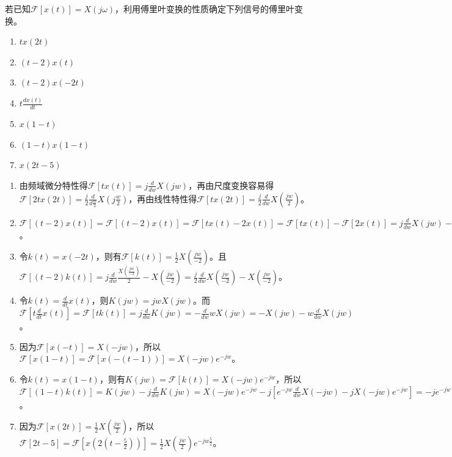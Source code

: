 \documentclass[answers]{exam}  %
\begin{document}
\begin{questions}
\question 若已知$\mathcal{F}[x(t)] = X(j\omega)$，利用傅里叶变换的性质确定下列信号的傅里叶变换。
\begin{enumerate}[(1)]
	\item $tx(2t)$
	\item $(t-2)x(t)$
	\item $(t-2)x(-2t)$
	\item $t\frac{dx(t)}{dt}$
	\item $x(1-t)$
	\item $(1-t)x(1-t)$
	\item $x(2t-5)$
\end{enumerate}


\begin{solution}
	\begin{enumerate}[(1)]
		\item 由频域微分特性得$\mathcal{F}[tx(t)]=j\frac{d}{dw}X(jw)$，再由尺度变换容易得$\mathcal{F}[2tx(2t)]=\frac{j}{2}\frac{d}{d\frac{w}{2}}X(j\frac{w}{2})$，再由线性特性得$\mathcal{F}[tx(2t)]=\frac{j}{2}\frac{d}{dw}X(\frac{jw}{2})$。
		\item $\mathcal{F}[(t-2)x(t)]=\mathcal{F}[(t-2)x(t)]=\mathcal{F}[tx(t)-2x(t)]=\mathcal{F}[tx(t)]-\mathcal{F}[2x(t)]=j\frac{d}{dw}X(jw)-2X(jw)$。
		\item 令$k(t)=x(-2t)$，则有$\mathcal{F}[k(t)]=\frac{1}{2}X(\frac{jw}{-2})$。且$\mathcal{F}[(t-2)k(t)]=j\frac{d}{dw}\frac{X(\frac{jw}{-2})}{2}-X(\frac{jw}{-2})=\frac{j}{2}\frac{d}{dw}X(\frac{jw}{-2})-X(\frac{jw}{-2})$。
		\item 令$k(t)=\frac{d}{dt}x(t)$，则$K(jw)=jwX(jw)$。而$\mathcal{F}[t\frac{d}{dt}x(t)]=\mathcal{F}[tk(t)]=j\frac{d}{dw}K(jw)=-\frac{d}{dw}wX(jw)=-X(jw)-w\frac{d}{dw}X(jw)$。
		\item 因为$\mathcal{F}[x(-t)]=X(-jw)$，所以$\mathcal{F}[x(1-t)]=\mathcal{F}[x(-(t-1))]=X(-jw)e^{-jw}$。
		\item 令$k(t)=x(1-t)$，则有$K(jw)=\mathcal{F}[k(t)]=X(-jw)e^{-jw}$，所以$\mathcal{F}[(1-t)k(t)]=K(jw)-j\frac{d}{dw}K(jw)=X(-jw)e^{-jw}-j[e^{-jw}\frac{d}{dw}X(-jw)-jX(-jw)e^{-jw}]=-je^{-jw}\frac{d}{dw}X(-jw)$。
		\item 因为$\mathcal{F}[x(2t)]=\frac{1}{2}X(\frac{jw}{2})$，所以$\mathcal{F}[2t-5]=\mathcal{F}[x(2(t-\frac{5}{2}))]=\frac{1}{2}X(\frac{jw}{2})e^{-jw\frac{5}{2}}$。
	\end{enumerate}
\end{solution}

\end{questions}
\end{document}
